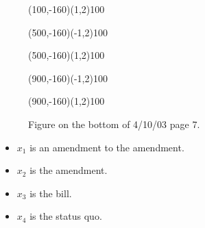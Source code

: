 \documentclass[12pt]{article}
\newcommand{\s}{\vspace{5mm}}
\begin{document}
\begin{itemize}
\begin{figure}[htb]
\begin{egame}
\renewcommand{\egarrowstyle}{}

\putbranch(100,-160)(1,2){100}

\renewcommand{\egarrowstyle}{}

\putbranch(500,-160)(-1,2){100}

\renewcommand{\egarrowstyle}{}

\putbranch(500,-160)(1,2){100}

\renewcommand{\egarrowstyle}{}

\putbranch(900,-160)(-1,2){100}

\renewcommand{\egarrowstyle}{}

\putbranch(900,-160)(1,2){100}

%
\end{egame}
\hspace*{\fill}\s\s\s\s\s\s\s\s\s
\caption[]{Figure on the bottom of 4/10/03 page 7.}\label{f:thirteen}
\end{figure}

\begin{itemize}
\item $x_1$ is an amendment to the amendment.  
\item $x_2$ is the amendment.  
\item $x_3$ is the bill.  
\item $x_4$ is the status quo.
\end{itemize}
\end{itemize}
\end{document}
